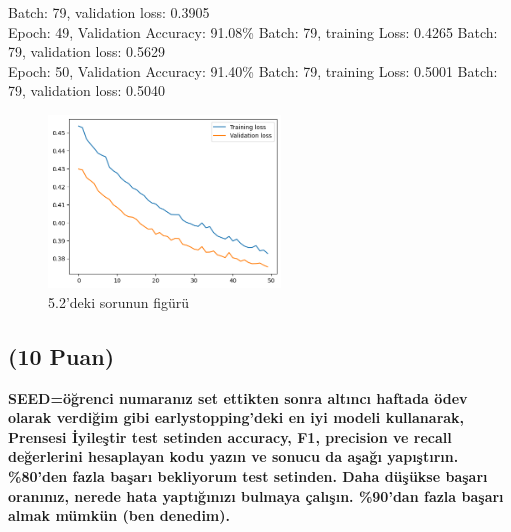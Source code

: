 \documentclass[11pt]{article}
\begin{document}
Batch: 79, validation loss: 0.3905\\
Epoch: 49, Validation Accuracy: 91.08\%
Batch: 79, training Loss: 0.4265
Batch: 79, validation loss: 0.5629\\
Epoch: 50, Validation Accuracy: 91.40\%
Batch: 79, training Loss: 0.5001
Batch: 79, validation loss: 0.5040
\begin{figure}[h]
    \centering
    \includegraphics[width=0.55\textwidth]{yapay.png}
    \caption{5.2'deki sorunun figürü}
    \label{fig:my_pic}
\end{figure}


\subsection{(10 Puan)} \textbf{SEED=öğrenci numaranız set ettikten sonra altıncı haftada ödev olarak verdiğim gibi earlystopping'deki en iyi modeli kullanarak, Prensesi İyileştir test setinden accuracy, F1, precision ve recall değerlerini hesaplayan kodu yazın ve sonucu da aşağı yapıştırın. \%80'den fazla başarı bekliyorum test setinden. Daha düşükse başarı oranınız, nerede hata yaptığınızı bulmaya çalışın. \%90'dan fazla başarı almak mümkün (ben denedim).}
\end{document}
